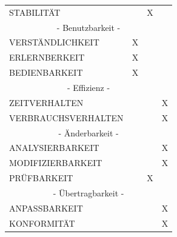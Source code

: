 \documentclass[a4paper]{scrreprt}
\begin{document}
\begin{table}[h!]
\begin{tabular}{llll}
    			STABILITÄT                                   &                                        &  \hspace{6mm}                    X               &                                      \\
    			\multicolumn{4}{c}{- Benutzbarkeit -}\\
    			VERSTÄNDLICHKEIT                             &                    X                    &                                   &                                      \\
    			ERLERNBERKEIT                                &                    X                    &                                   &                                      \\
    			BEDIENBARKEIT                                &                    X                    &                                   &                                      \\
    			\multicolumn{4}{c}{- Effizienz -}\\
    			ZEITVERHALTEN                                &                                        &                                   &      \hspace{6mm}                 X                \\
    			VERBRAUCHSVERHALTEN                          &                                        &                                   &      \hspace{6mm}                 X                \\
    			\multicolumn{4}{c}{- Änderbarkeit -}\\
    			ANALYSIERBARKEIT                             &                                        &                                   &       \hspace{6mm}                X                \\
    			MODIFIZIERBARKEIT                            &                                        &                                   &        \hspace{6mm}               X                \\
    			PRÜFBARKEIT                                  &                                        &     \hspace{6mm}                 X               &                                     \\
    			\multicolumn{4}{c}{- Übertragbarkeit -}\\
    			ANPASSBARKEIT                                &                                        &                                   &        \hspace{6mm}               X                \\
    			KONFORMITÄT                                  &                                        &                                   &        \hspace{6mm}               X             \\  
    		\end{tabular}
    	\end{table}
\end{document}
